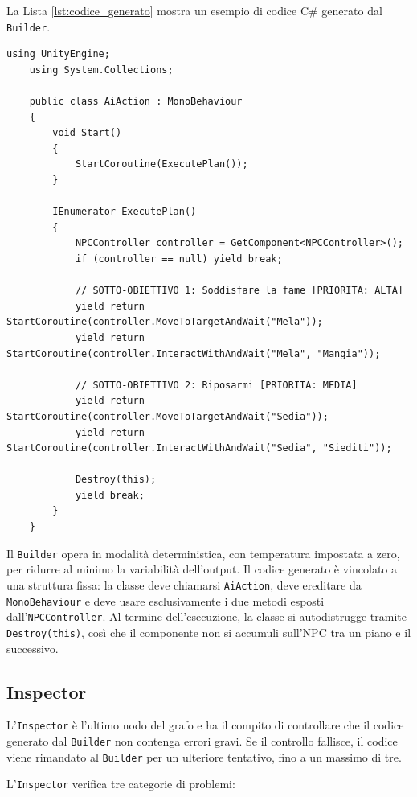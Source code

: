 La Lista \ref{lst:codice_generato} mostra un esempio di codice C\# generato dal \texttt{Builder}.

\begin{lstlisting}[style=jsonstyle, caption={Esempio di codice C\# generato dal Builder.}, label={lst:codice_generato}]
	using UnityEngine;
	using System.Collections;
	
	public class AiAction : MonoBehaviour
	{
		void Start()
		{
			StartCoroutine(ExecutePlan());
		}
		
		IEnumerator ExecutePlan()
		{
			NPCController controller = GetComponent<NPCController>();
			if (controller == null) yield break;
			
			// SOTTO-OBIETTIVO 1: Soddisfare la fame [PRIORITA: ALTA]
			yield return StartCoroutine(controller.MoveToTargetAndWait("Mela"));
			yield return StartCoroutine(controller.InteractWithAndWait("Mela", "Mangia"));
			
			// SOTTO-OBIETTIVO 2: Riposarmi [PRIORITA: MEDIA]
			yield return StartCoroutine(controller.MoveToTargetAndWait("Sedia"));
			yield return StartCoroutine(controller.InteractWithAndWait("Sedia", "Siediti"));
			
			Destroy(this);
			yield break;
		}
	}
\end{lstlisting}

Il \texttt{Builder} opera in modalità deterministica, con temperatura impostata a zero, per ridurre al minimo la variabilità dell'output. Il codice generato è vincolato a una struttura fissa: la classe deve chiamarsi \texttt{AiAction}, deve ereditare da \texttt{MonoBehaviour} e deve usare esclusivamente i due metodi esposti dall'\texttt{NPCController}. Al termine dell'esecuzione, la classe si autodistrugge tramite \texttt{Destroy(this)}, così che il componente non si accumuli sull'NPC tra un piano e il successivo.

\subsection{Inspector}

L'\texttt{Inspector} è l'ultimo nodo del grafo e ha il compito di controllare che il codice generato dal \texttt{Builder} non contenga errori gravi. Se il controllo fallisce, il codice viene rimandato al \texttt{Builder} per un ulteriore tentativo, fino a un massimo di tre.

L'\texttt{Inspector} verifica tre categorie di problemi:

